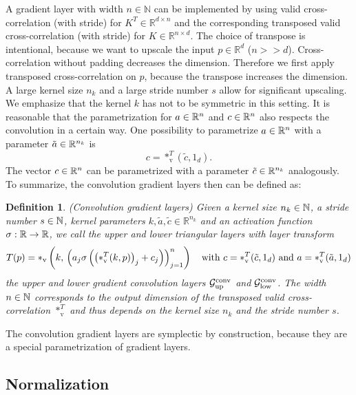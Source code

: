 \documentclass[twoside,a4paper]{article}
\newtheorem{definition}{Definition}
\begin{document}
A gradient layer with width $n \in \mathbb{N}$ can be implemented by 
using valid cross-correlation (with stride) for $K^T \in \mathbb{R}^{d \times n}$ and the
corresponding transposed valid cross-correlation (with stride) for $K \in \mathbb{R}^{n \times d}$.
The choice of transpose is intentional, because we want to upscale the input $p \in \mathbb{R}^d$ ($n >> d$). 
Cross-correlation without padding decreases the dimension. Therefore we first apply 
transposed cross-correlation on $p$, because the transpose increases the dimension.
A large kernel size $n_k$ and a large stride number $s$ allow for significant upscaling.
We emphasize that the kernel $k$ has not to be symmetric in this setting. 
It is reasonable that the parametrization for $a \in \mathbb{R}^n$ and $c \in \mathbb{R}^n$ also respects
the convolution in a certain way.
One possibility to parametrize $a \in \mathbb{R}^n$ with a parameter $\tilde{a} \in \mathbb{R}^{n_k}$ is
\begin{equation*}
	c = *_{\text{v}}^T(\tilde{c},1_d)
	.
\end{equation*}
The vector $c \in \mathbb{R}^n$ can be parametrized with a parameter $\tilde{c} \in \mathbb{R}^{n_k}$ analogously.
To summarize, the convolution gradient layers then can be defined as:
\begin{definition}
	(Convolution gradient layers)
	Given a kernel size $n_k \in \mathbb{N}$, a stride number $s \in \mathbb{N}$,
	kernel parameters $k,\tilde{a},\tilde{c} \in \mathbb{R}^{n_k}$ and
	an activation function $\sigma : \mathbb{R} \to \mathbb{R}$,
	we call the upper and lower triangular layers with layer transform
	\begin{equation*}
		T(p) = *_{\text{v}} \left( k, \, \left( a_j \sigma \left( \left( *_{\text{v}}^T(k,p) \right)_j + c_j \right) \right)_{j=1}^n \right) 
		\quad
		\text{with } c = *_{\text{v}}^T(\tilde{c},1_d) 
		\text{ and } a = *_{\text{v}}^T(\tilde{a},1_d)
	\end{equation*}
	the upper and lower gradient convolution layers 
	$\mathcal{G}_{\text{up}}^{\text{conv}}$ and $\mathcal{G}_{\text{low}}^{\text{conv}}$.
	The width $n \in \mathbb{N}$ corresponds to the output dimension of the transposed valid cross-correlation $*_{\text{v}}^T$
	and thus depends on the kernel size $n_k$ and the stride number $s$.
\end{definition}

The convolution gradient layers are symplectic by construction,
because they are a special parametrization of gradient layers.


\subsection{Normalization}
\end{document}
